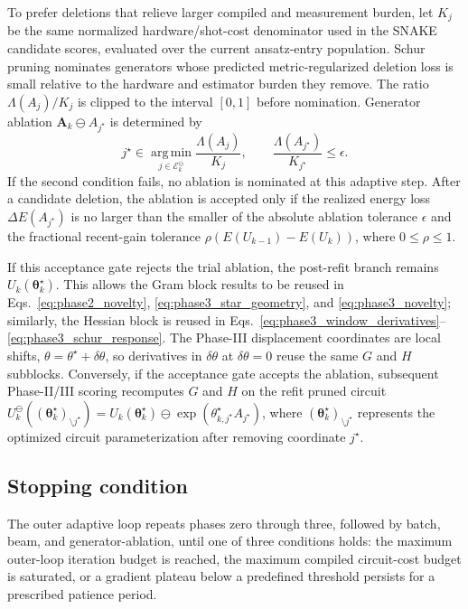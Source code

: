 \documentclass[
  reprint,
  amsmath,
  amssymb,
  aps,
  pra,
  nofootinbib,
  superscriptaddress,
  floatfix
]{revtex4-2}
\begin{document}
To prefer deletions that relieve larger compiled and measurement burden, let
\(K_j\) be the same normalized hardware/shot-cost denominator used in the SNAKE
candidate scores, evaluated over the current ansatz-entry population. Schur
pruning nominates generators whose predicted metric-regularized deletion loss
is small relative to the hardware and estimator burden they remove. The ratio
\(\Lambda(A_j)/K_j\) is clipped to the interval \([0,1]\) before nomination.
Generator ablation \(\mathbf A_k\ominus A_{j^\star}\) is determined by
\begin{equation*}
j^\star
\in
\operatorname*{arg\,min}_{j\in\mathcal E_k^\ominus}
\frac{\Lambda(A_j)}{K_j},
\qquad
\frac{\Lambda(A_{j^\star})}{K_{j^\star}}
\le
\epsilon .
\end{equation*}
If the second condition fails, no ablation is nominated at this adaptive step.
After a candidate deletion, the ablation is accepted only if the realized energy
loss \(\Delta E(A_{j^\star})\) is no larger than the smaller of the absolute
ablation tolerance \(\epsilon\) and the fractional recent-gain tolerance
\(\rho\left(E(U_{k-1})-E(U_k)\right)\), where \(0\le\rho\le1\).

If this acceptance gate rejects the trial ablation, the post-refit
branch remains \(U_k(\boldsymbol\theta_k^\star)\). This allows the Gram block results to be
reused in Eqs.~\eqref{eq:phase2_novelty}, \eqref{eq:phase3_star_geometry}, and
\eqref{eq:phase3_novelty}; similarly, the Hessian block is reused in
Eqs.~\eqref{eq:phase3_window_derivatives}--\eqref{eq:phase3_schur_response}.
The Phase-III displacement coordinates are local
shifts, \(\theta=\theta^\star+\delta\theta\), so derivatives in
\(\delta\theta\) at \(\delta\theta=0\) reuse the same \(G\) and \(H\)
subblocks. Conversely, if the acceptance gate accepts the ablation, subsequent Phase-II/III
scoring recomputes \(G\) and \(H\) on the refit pruned circuit
\(U_k^{\ominus}((\boldsymbol\theta_k^\star)_{\setminus j^\star})
=
U_k(\boldsymbol\theta_k^\star)\ominus
\exp(\theta_{k,j^\star}^\star A_{j^\star})\), where \((\boldsymbol\theta_k^\star)_{\setminus j^\star}\) represents the optimized circuit parameterization after removing coordinate \(j^\star\).



\subsection{Stopping condition}
The outer adaptive loop repeats phases zero through three, followed by batch, beam, and generator-ablation, until one of three conditions holds: the maximum outer-loop iteration budget is reached, the maximum compiled circuit-cost budget is saturated, or a gradient plateau below a predefined threshold persists for a prescribed patience period.
\end{document}

